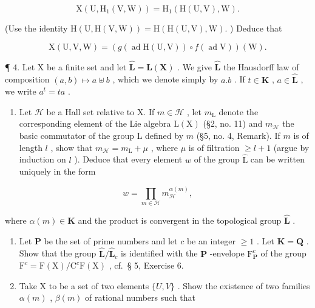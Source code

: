 \[
\mathrm{X} (\mathrm{U}, \mathrm{H} _ {1} (\mathrm{V}, \mathrm{W})) = \mathrm{H} _ {1} (\mathrm{H} (\mathrm{U}, \mathrm{V}), \mathrm{W}).
\]

(Use the identity \(\mathrm{H}(\mathrm{U},\mathrm{H}(\mathrm{V},\mathrm{W})) = \mathrm{H}(\mathrm{H}(\mathrm{U},\mathrm{V}),\mathrm{W}).\) ) Deduce that

\[
\mathrm{X} (\mathrm{U}, \mathrm{V}, \mathrm{W}) = (g (\operatorname{ad} \mathrm{H} (\mathrm{U}, \mathrm{V})) \circ f (\operatorname{ad} \mathrm{V})) (\mathrm{W}).
\]

¶ 4. Let X be a finite set and let \(\hat{\mathbf{L}} = \hat{\mathbf{L}}(\mathbf{X})\) . We give \(\hat{\mathbf{L}}\) the Hausdorff law of composition \((a, b) \mapsto a \uplus b\) , which we denote simply by \(a.b\) . If \(t \in \mathbf{K}\) , \(a \in \hat{\mathbf{L}}\) , we write \(a^t = t a\) .

\begin{enumerate}
\def\labelenumi{(\alph{enumi})}
\tightlist
\item
  Let \(\mathcal{H}\) be a Hall set relative to X. If \(m \in \mathcal{H}\) , let \(m_{\mathrm{L}}\) denote the corresponding element of the Lie algebra \(\mathrm{L}(\mathrm{X})\) (§2, no. 11) and \(m_{\mathcal{H}}\) the basic commutator of the group \(\hat{\mathrm{L}}\) defined by \(m\) (§5, no. 4, Remark). If \(m\) is of length \(l\) , show that \(m_{\mathcal{H}} = m_{\mathrm{L}} + \mu\) , where \(\mu\) is of filtration \(\geqslant l + 1\) (argue by induction on \(l\) ). Deduce that every element \(w\) of the group \(\hat{\mathrm{L}}\) can be written uniquely in the form
\end{enumerate}

\[
w = \prod_ {m \in \mathcal {H}} m _ {\mathcal {H}} ^ {\alpha (m)},
\]


where \(\alpha(m) \in \mathbf{K}\) and the product is convergent in the topological group \(\hat{\mathbf{L}}\) .

\begin{enumerate}
\def\labelenumi{(\alph{enumi})}
\setcounter{enumi}{1}
\item
  Let \(\mathbf{P}\) be the set of prime numbers and let \(c\) be an integer \(\geqslant 1\) . Let \(\mathbf{K} = \mathbf{Q}\) . Show that the group \(\hat{\mathbf{L}} / \hat{\mathbf{L}}_c\) is identified with the \(\mathbf{P}\) -envelope \(\mathrm{F}_{\mathbf{P}}^{c}\) of the group \(\mathrm{F}^c = \mathrm{F}(\mathrm{X}) / \mathrm{C}^c\mathrm{F}(\mathrm{X})\) , cf.~§ 5, Exercise 6.
\item
  Take X to be a set of two elements \(\{U, V\}\) . Show the existence of two families \(\alpha(m)\) , \(\beta(m)\) of rational numbers such that
\end{enumerate}

